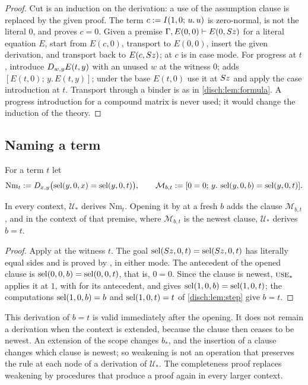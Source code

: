 \begin{proof}
Cut is an induction on the derivation: a use of the assumption clause is
replaced by the given proof. The term $c\mathrel{:=}I(1,0;\,u.\,u)$ is
zero-normal, is not the literal $0$, and  proves $c=0$.
Given a premise $\Gamma,E(0,0)\vdash E(0,S z)$ for a literal equation
$E$, start from $E(c,0)$, transport to $E(0,0)$, insert the given
derivation, and transport back to $E(c,S z)$;  at $c$ is
in case mode. For progress at $t$, introduce $D_{w,y}E(t,y)$ with an
unused $w$ at the witness $0$;  adds
$[E(t,0);\,y.\,E(t,y)]$; under the base $E(t,0)$ use it at $S z$ and
apply the case introduction at $t$. Transport through a binder is as in
\cref{disch:lem:formula}. A progress introduction for a compound matrix is
never used; it would change the induction of the theory.
\end{proof}

\subsection{Naming a term}

For a term $t$ let
\[
 \mathrm{Nm}_t\mathrel{:=}D_{x,y}\bigl(\operatorname{sel}(y,0,x)=\operatorname{sel}(y,0,t)\bigr),\qquad
 \mathcal M_{b,t}\mathrel{:=}[0=0;\,y.\,\operatorname{sel}(y,0,b)=\operatorname{sel}(y,0,t)].
\]

\begin{lemma}[Naming]
\label{disch:lem:spec-name}
In every context, $\mathcal U_*$ derives $\mathrm{Nm}_t$. Opening it by
 at a fresh $b$ adds the clause $\mathcal M_{b,t}$, and in
the context of that premise, where $\mathcal M_{b,t}$ is the newest
clause, $\mathcal U_*$ derives $b=t$.
\end{lemma}

\begin{proof}
Apply  at the witness $t$. The goal
$\operatorname{sel}(S z,0,t)=\operatorname{sel}(S z,0,t)$ has literally equal sides and is
proved by , in either mode. The antecedent of the opened
clause is $\operatorname{sel}(0,0,b)=\operatorname{sel}(0,0,t)$, that is, $0=0$. Since the clause is
newest, $\rulename{Use}_*$ applies it at $1$, with  for its
antecedent, and gives $\operatorname{sel}(1,0,b)=\operatorname{sel}(1,0,t)$; the computations
$\operatorname{sel}(1,0,b)=b$ and $\operatorname{sel}(1,0,t)=t$ of \cref{disch:lem:step} give $b=t$.
\end{proof}

This derivation of $b=t$ is valid immediately after the opening. It does
not remain a derivation when the context is extended, because the clause
then ceases to be newest. An extension of the scope changes $b_*$, and the
insertion of a clause changes which clause is newest; so weakening is not
an operation that preserves the rule at each node of a derivation of
$\mathcal U_*$. The completeness proof replaces weakening by procedures
that produce a proof again in every larger context.


